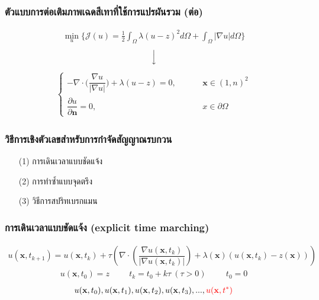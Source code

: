 \documentclass[xcolor=dvipsnames, xetex,serif]{beamer}
\numberwithin{equation}{section}
\begin{document}
    \begin{frame}
        \frametitle{ตัวแบบการต่อเติมภาพเฉดสีเทาที่ใช้การแปรผันรวม (ต่อ)}
        \begin{align*}
        \min_{u} \{ \mathcal{J}(u) = \frac{1}{2} \int_{\Omega}\lambda (u-z)^2 d\Omega +  \int_{\Omega}  |\nabla u|  d\Omega \}
        \end{align*}
        $$ \Big \downarrow$$
        \begin{align*}
        \left \{ \begin{array}{ll}  - \nabla \cdot  \Big( \dfrac{\nabla u}{|\nabla u|} \Big) + \lambda (u-z) = 0,  & \hspace{1cm} \mathbf{x} \in (1,n)^2 \\ \dfrac{\partial u}{\partial \boldsymbol{n}} = 0, & \hspace{1cm} x \in \partial \Omega \end{array} \right .
        \end{align*}			
    \end{frame} 
    \begin{frame}
        \frametitle{วิธีการเชิงตัวเลขสำหรับการกำจัดสัญญาณรบกวน}
        \begin{itemize}
            \item[(1)] การเดินเวลาแบบชัดแจ้ง
            \item[(2)] การทำซ้ำแบบจุดตรึง
            \item[(3)] วิธีการสปริทเบรกแมน
        \end{itemize}
    \end{frame}
    \begin{frame}
        \frametitle{การเดินเวลาแบบชัดแจ้ง (explicit time marching)}
        \begin{align*}
        u(\mathbf{x},t_{k+1})=u(\mathbf{x},t_{k})+\tau\left(\nabla \cdot\left(\dfrac{\nabla u (\mathbf{x},t_k)}{| \nabla u (\mathbf{x},t_k) | }\right) + \lambda(\mathbf{x})(u (\mathbf{x},t_k)-z(\mathbf{x})) \right)
        \end{align*}
        \begin{align*}
        u(\mathbf{x},t_0)=z \hspace{1cm} t_k=t_0+k\tau\ (\tau>0)  \hspace{1cm}  t_0=0
        \end{align*}
        \vspace{1cm}
        \begin{align*}
            u(\mathbf{x},t_0), u(\mathbf{x},t_1), u(\mathbf{x},t_2), u(\mathbf{x},t_3), ... ,  \textcolor{red}{u(\mathbf{x},t^{*})}
        \end{align*}
        \let\thefootnote\relax{}			
    \end{frame} 
\end{document}
